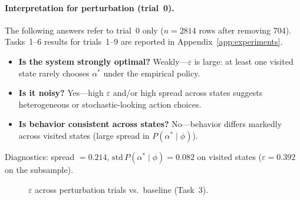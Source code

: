 \documentclass[11pt,a4paper]{article}
\begin{document}
\paragraph{Interpretation for perturbation (trial~0).}
The following answers refer to trial~0 only ($n=2814$ rows after removing 704).
Tasks~1--6 results for trials~1--9 are reported in Appendix~\ref{app:experiments}.
\begin{itemize}[noitemsep]
  \item \textbf{Is the system strongly optimal?}
        Weakly---$\varepsilon$ is large: at least one visited state rarely chooses
        $\alpha^\ast$ under the empirical policy.
  \item \textbf{Is it noisy?}
        Yes---high $\varepsilon$ and/or high spread across states suggests
        heterogeneous or stochastic-looking action choices.
  \item \textbf{Is behavior consistent across states?}
        No---behavior differs markedly across visited states (large spread in
        $P(\alpha^\ast\mid\phi)$).
\end{itemize}
\noindent Diagnostics: spread $=0.214$, $\mathrm{std}\,P(\alpha^\ast\mid\phi)=0.082$ on
visited states ($\varepsilon=0.392$ on the subsample).

\begin{figure}[H]
  \centering
  \caption{$\varepsilon$ across perturbation trials vs.\ baseline (Task~3).}
  \label{fig:eps-trials}
\end{figure}
\end{document}
